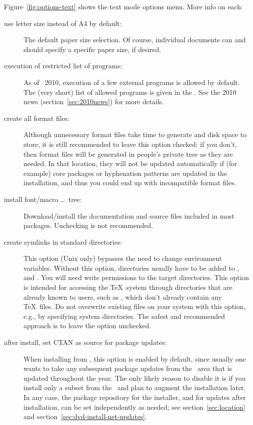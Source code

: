 \documentclass{article}
\begin{document}
Figure~\ref{fig:options-text} shows the text mode options menu.
More info on each:

\begin{description}
\item[use letter size instead of A4 by default:] The default paper
  size selection.  Of course, individual documents can and should
  specify a specific paper size, if desired.

\item[execution of restricted list of programs:] As of \TL\ 2010,
  execution of a few external programs is allowed by default.  The (very
  short) list of allowed programs is given in the .
  See the 2010 news (section~\ref{sec:2010news}) for more details.

\item[create all format files:] Although unnecessary format files
  take time to generate and disk space to store, it is still recommended
  to leave this option checked: if you don't, then format files will be
  generated in people's private  tree as they are
  needed.  In that location, they will not be updated automatically if
  (for example) core packages or hyphenation patterns are updated in the
  installation, and thus you could end up with incompatible format files.

\item[install font/macro \ldots\ tree:] Download/install the
  documentation and source files included in most packages.  Unchecking
  is not recommended.

\item[create symlinks in standard directories:]
  This option (Unix only) bypasses the need to change environment
  variables. Without this option, \TL{} directories usually have to be
  added to ,  and . You
  will need write permissions to the target directories.  This option is
  intended for accessing the \TeX\ system through directories that are
  already known to users, such as , which don't
  already contain any \TeX\ files.  Do not overwrite existing files on
  your system with this option, e.g., by specifying system directories.
  The safest and recommended approach is to leave the option unchecked.

\item[after install, set CTAN as source for package updates:]
  When installing from \DVD, this
  option is enabled by default, since usually one wants to take any
  subsequent package updates from the \CTAN\ area that is updated
  throughout the year.  The only likely reason to disable it is if you
  install only a subset from the \DVD\ and plan to augment the
  installation later.  In any case, the package repository for the
  installer, and for updates after installation, can be set
  independently as needed; see section~\ref{sec:location} and
  section~\ref{sec:dvd-install-net-updates}.
\end{description}
\end{document}
